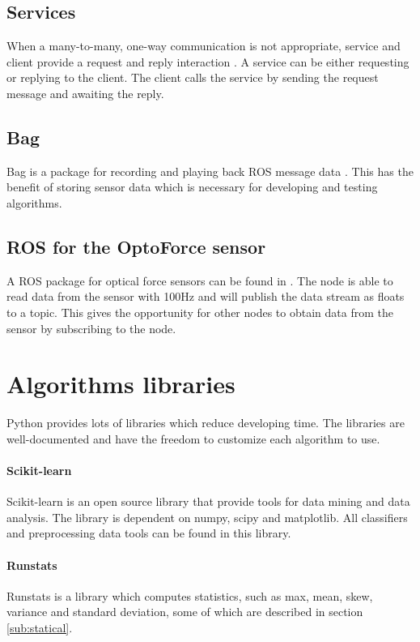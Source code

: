\documentclass[USenglish]{ifimaster}  %
\begin{document}
\subsection{Services}
When a many-to-many, one-way communication is not appropriate, service and client provide a request and reply interaction \cite{ROSconcept}. A service can be either requesting or replying to the client. The client calls the service by sending the request message and awaiting the reply.


\subsection{Bag}
Bag is a package for recording and playing back ROS message data \cite{ROSconcept}. This has the benefit of storing sensor data which is necessary for developing and testing algorithms.


\subsection{ROS for the OptoForce sensor}  
A ROS package for optical force sensors can be found in \cite{optoRos}. The node is able to read data from the sensor with 100Hz and will publish the data stream as floats to a topic. This gives the opportunity for other nodes to obtain data from the sensor by subscribing to the node.


\section{Algorithms libraries}
Python provides lots of libraries which reduce developing time. The libraries are well-documented and have the freedom to customize each algorithm to use.

\paragraph{Scikit-learn}
Scikit-learn \cite{scikit-learn} is an open source library that provide tools for data mining and data analysis. The library is dependent on numpy, scipy and matplotlib. All classifiers and preprocessing data tools can be found in this library. 

\paragraph{Runstats}
Runstats \cite{runstats} is a library which computes statistics, such as max, mean, skew, variance and standard deviation, some of which are described in section \ref{sub:statical}.
\end{document}

